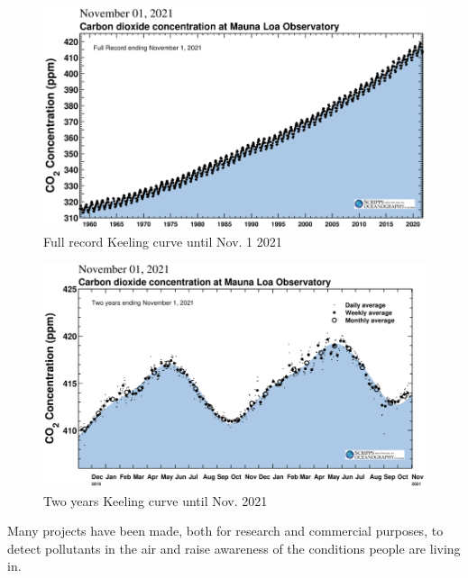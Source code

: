 		\noindent
		\begin{minipage}{0.49\textwidth}%
			\begin{figure}[H]
				\centering
				\includegraphics[width=\textwidth]{resources/img/chap2/keeling}
				\caption{Full record Keeling curve until Nov. 1 2021}				\label{keeling_full}
			\end{figure}
		\end{minipage}%
		\hfill%
		\begin{minipage}{0.49\textwidth}\raggedright
			\begin{figure}[H]
				\centering				
				\includegraphics[width=\textwidth]{resources/img/chap2/mlo_two_years}
				\caption{Two years Keeling curve until Nov. 2021}
				\label{keeling_two}
			\end{figure}
		\end{minipage}
		\vspace{0.5cm}
		
		Many projects have been made, both for research and commercial purposes, to detect pollutants in the air and raise awareness of the conditions people are living in.
				
